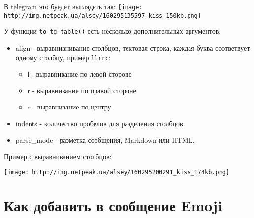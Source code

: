 \documentclass[
]{book}
\newenvironment{Shaded}{\begin{snugshade}}{\end{snugshade}}
\newcommand{\AttributeTok}[1]{\textcolor[rgb]{0.77,0.63,0.00}{#1}}
\newcommand{\CommentTok}[1]{\textcolor[rgb]{0.56,0.35,0.01}{\textit{#1}}}
\newcommand{\DecValTok}[1]{\textcolor[rgb]{0.00,0.00,0.81}{#1}}
\newcommand{\FunctionTok}[1]{\textcolor[rgb]{0.00,0.00,0.00}{#1}}
\newcommand{\NormalTok}[1]{#1}
\newcommand{\OtherTok}[1]{\textcolor[rgb]{0.56,0.35,0.01}{#1}}
\newcommand{\SpecialCharTok}[1]{\textcolor[rgb]{0.00,0.00,0.00}{#1}}
\newcommand{\StringTok}[1]{\textcolor[rgb]{0.31,0.60,0.02}{#1}}
\providecommand{\tightlist}{%
  \setlength{\itemsep}{0pt}\setlength{\parskip}{0pt}}
\begin{document}
В telegram это буедет выглядеть так:
\texttt{[image: http://img.netpeak.ua/alsey/160295135597\_kiss\_150kb.png]}

У функции \texttt{to\_tg\_table()} есть несколько дополнительных аргументов:

\begin{itemize}
\tightlist
\item
  align - выравнивнивание столбцов, тектовая строка, каждая буква соответвует одному столбцу, пример \texttt{\textquotesingle{}llrrc\textquotesingle{}}:

  \begin{itemize}
  \tightlist
  \item
    l - выравнивание по левой стороне
  \item
    r - выравнивание по правой стороне
  \item
    c - выравнивание по центру
  \end{itemize}
\item
  indents - количество пробелов для разделения столбцов.
\item
  parse\_mode - разметка сообщения, Markdown или HTML.
\end{itemize}

Пример с выравниванием столбцов:

\begin{Shaded}
\end{Shaded}

\texttt{[image: http://img.netpeak.ua/alsey/160295200291\_kiss\_174kb.png]}

\hypertarget{ux43aux430ux43a-ux434ux43eux431ux430ux432ux438ux442ux44c-ux432-ux441ux43eux43eux431ux449ux435ux43dux438ux435-emoji}{%
\section{Как добавить в сообщение Emoji}\label{ux43aux430ux43a-ux434ux43eux431ux430ux432ux438ux442ux44c-ux432-ux441ux43eux43eux431ux449ux435ux43dux438ux435-emoji}}
\end{document}
